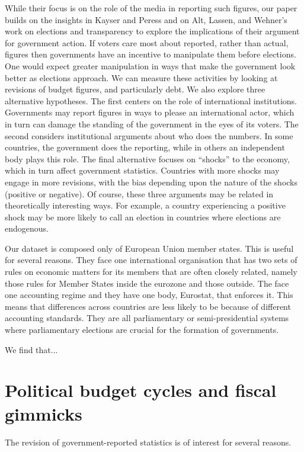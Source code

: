 \documentclass[]{article}
\begin{document}
While their focus is on the role of the media in reporting such figures, our paper builds on the insights in Kayser and Peress and on Alt, Lassen, and Wehner’s work on elections and transparency to explore the implications of their argument for government action. If voters care most about reported, rather than actual, figures then governments have an incentive to manipulate them before elections. One would expect greater manipulation in ways that make the government look better as elections approach. We can measure these activities by looking at revisions of budget figures, and particularly debt. We also explore three alternative hypotheses. The first centers on the role of international institutions. Governments may report figures in ways to please an international actor, which in turn can damage the standing of the government in the eyes of its voters. The second considers institutional arguments about who does the numbers. In some countries, the government does the reporting, while in others an independent body plays this role. The final alternative focuses on “shocks” to the economy, which in turn affect government statistics. Countries with more shocks may engage in more revisions, with the bias depending upon the nature of the shocks (positive or negative). Of course, these three arguments may be related in theoretically interesting ways. For example, a country experiencing a positive shock may be more likely to call an election in countries where elections are endogenous.

Our dataset is composed only of European Union member states. This is useful for several reasons. They face one international organisation that has two sets of rules on economic matters for its members that are often closely related, namely those rules for Member States inside the eurozone and those outside. The face one accounting regime and they have one body, Eurostat, that enforces it. This means that differences across countries are less likely to be because of different accounting standards. They are all parliamentary or semi-presidential systems where parliamentary elections are crucial for the formation of governments.

We find that...

\section{Political budget cycles and fiscal gimmicks}

The revision of government-reported statistics is of interest for several reasons.
\end{document}
